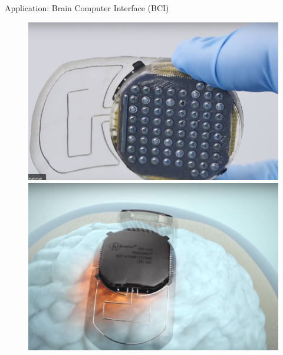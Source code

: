 \documentclass[9pt]{beamer}
\begin{document}
\begin{frame}{Application: Brain Computer Interface (BCI)}
\begin{minipage}{0.45\linewidth}
	\begin{figure}
		\includegraphics[width=0.96\linewidth]{figs/deviceClinatec} \\
		\includegraphics[width=0.96\linewidth]{figs/brainClinatec}
	\end{figure}
\end{minipage}%
\begin{minipage}{0.55\linewidth}
	\centering

\end{minipage}
\end{frame}
\end{document}
